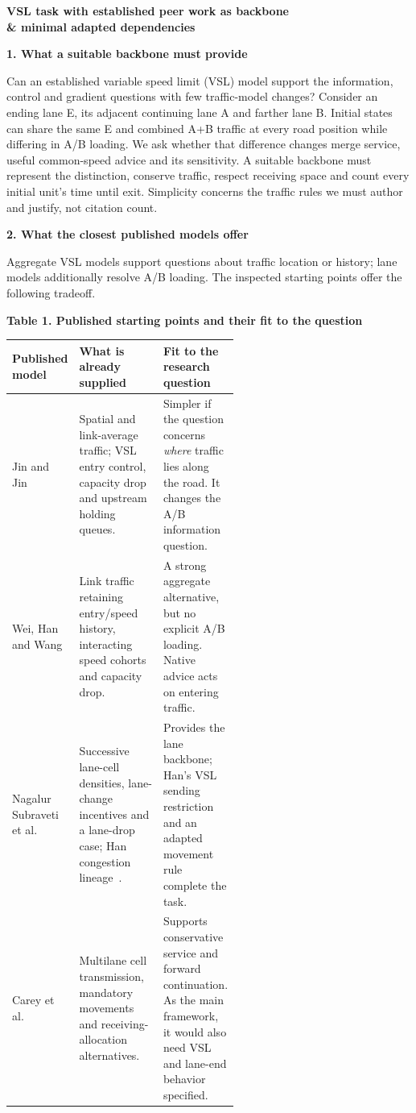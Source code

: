 \documentclass[10pt,a4paper]{article}
\newcommand{\Jin}[1]{\textcolor{SrcJin}{#1}}
\newcommand{\Wei}[1]{\textcolor{SrcWei}{#1}}
\newcommand{\NS}[1]{\textcolor{SrcNS}{#1}}
\newcommand{\Hsix}[1]{\textcolor{SrcHan16}{#1}}
\newcommand{\Hseven}[1]{\textcolor{SrcHan17}{#1}}
\newcommand{\Carey}[1]{\textcolor{SrcCarey}{#1}}
\newcommand{\scite}[2]{\textcolor{#1}{\cite{#2}}}
\newcommand{\head}[1]{\par\vspace{5pt}\noindent\textbf{#1}\par\nobreak\vspace{1pt}}
\begin{document}
\begin{center}
{\large\bfseries VSL task with established peer work as backbone\\[1pt]
\& minimal adapted dependencies}
\end{center}
\vspace{-3pt}

\head{1. What a suitable backbone must provide}
Can an established variable speed limit (VSL) model support the information,
control and gradient questions with few traffic-model changes? Consider an
ending lane E, its adjacent continuing lane A and farther lane B. Initial
states can share the same E and combined A+B traffic at every road position
while differing in A/B loading. We ask whether that difference changes merge
service, useful common-speed advice and its sensitivity. A suitable backbone
must represent the distinction, conserve traffic, respect receiving space
and count every initial unit's time until exit. Simplicity concerns the
traffic rules we must author and justify, not citation count.

\head{2. What the closest published models offer}
Aggregate VSL models support questions about traffic location or history;
lane models additionally resolve A/B loading. The inspected starting points
offer the following tradeoff.

\begin{center}
\textbf{Table 1. Published starting points and their fit to the question}\par
\vspace{3pt}
\begin{tabularx}{\linewidth}{@{}>{\raggedright\arraybackslash}p{0.19\linewidth}
 >{\raggedright\arraybackslash}p{0.37\linewidth}
 >{\raggedright\arraybackslash}X@{}}
\toprule
Published model & What is already supplied & Fit to the research question\\
\midrule
\Jin{Jin and Jin}~\scite{SrcJin}{jinjin}
& Spatial and link-average traffic; VSL entry control, capacity drop and
upstream holding queues.
& Simpler if the question concerns \emph{where} traffic lies along the
road. It changes the A/B information question.\\[3pt]
\Wei{Wei, Han and Wang}~\scite{SrcWei}{wei}
& Link traffic retaining entry/speed history, interacting speed cohorts
and capacity drop.
& A strong aggregate alternative, but no explicit A/B loading. Native
advice acts on entering traffic.\\[3pt]
\NS{Nagalur Subraveti et al.}~\scite{SrcNS}{ns}
& Successive lane-cell densities, lane-change incentives and a lane-drop
case; \Hsix{Han congestion lineage}~\scite{SrcHan16}{han16}.
& Provides the lane backbone; \Hseven{Han's VSL sending restriction}~\scite{SrcHan17}{han17}
and an adapted movement rule complete the task.\\[3pt]
\Carey{Carey et al.}~\scite{SrcCarey}{carey}
& Multilane cell transmission, mandatory movements and receiving-allocation
alternatives.
& Supports conservative service and forward continuation. As the main
framework, it would also need VSL and lane-end behavior specified.\\
\bottomrule
\end{tabularx}
\end{center}
\end{document}
